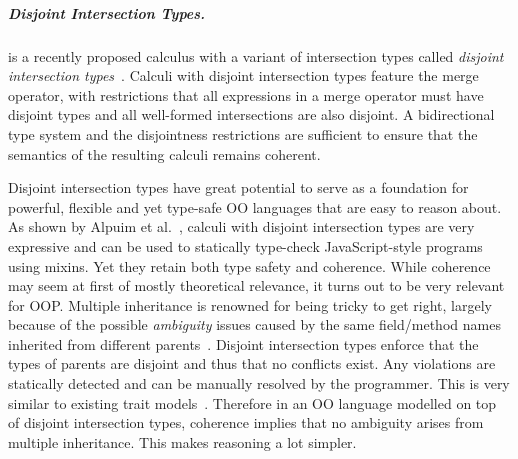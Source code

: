 \subparagraph{Disjoint Intersection Types.}
\oname is a recently proposed calculus with a variant of intersection types 
called \emph{disjoint intersection types}~\cite{oliveira2016disjoint}.
Calculi with disjoint intersection types feature the merge 
operator, with restrictions that all expressions in a merge 
operator must have disjoint types and all well-formed intersections 
are also disjoint. A bidirectional type system and the disjointness restrictions are
sufficient to ensure that the semantics of the resulting calculi remains 
coherent. 

\begin{comment}
The merge operator was introduced by Reynolds 
and Forsythe and adopted by a few other calculi as well~\cite{}.
Unfortunately, while the merge operator is powerful, it makes 
it hard to get a \emph{coherent} semantics. \bruno{what is coherence}
Perhaps because 
of this issue the merge operator has not been adopted by 
many language designs. Disjoint intersection types provide 
a remedy for the coherence problem, by imposing restrictions 
on the uses of merges and on the formation of intersection types. 
\bruno{merge operator ==> models inheritance; intersection types ==> 
model subtyping}

In essence disjoint intersection types retain most of the 
expressive power of the merge operator.
For example, they can 
be used to model powerful forms of extensible records~\cite{}.
\end{comment}

Disjoint intersection types have great potential to serve as a foundation for
powerful, flexible and yet type-safe OO languages that are easy to reason
about. As shown by Alpuim et al.~\cite{alpuimdisjoint}, calculi with disjoint intersection
types are very
expressive and can be used to statically type-check JavaScript-style programs
using mixins. Yet they retain both type safety and coherence. While
coherence may seem at first of mostly theoretical relevance, it
turns out to be very relevant for OOP. Multiple
inheritance is renowned for being tricky to get right, largely because of the
possible \emph{ambiguity} issues caused by the same field/method names
inherited from different parents~\cite{bracha1990mixin, scharli2003traits}. Disjoint intersection types
enforce that the types of parents are disjoint and thus that no conflicts exist.
Any violations are statically detected and can be manually resolved by the
programmer.
This is very similar
to existing trait models~\cite{fisher2004typed,
  ducasse2006traits}. Therefore in an OO language
modelled on top of disjoint intersection types, coherence implies
that no ambiguity arises from multiple inheritance. This makes
reasoning a lot simpler.

